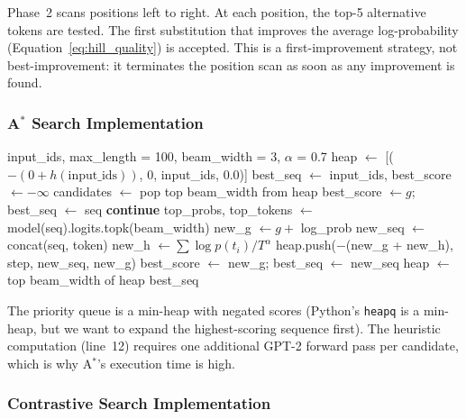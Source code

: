 \documentclass[12pt]{article}
\begin{document}
	Phase~2 scans positions left to right. At each position, the top-5 alternative tokens are tested. The first substitution that improves the average log-probability (Equation~\ref{eq:hill_quality}) is accepted. This is a first-improvement strategy, not best-improvement: it terminates the position scan as soon as any improvement is found.
	
	\subsubsection{A$^*$ Search Implementation}
	
	\begin{algorithm}[H]
		\caption{Improved A$^*$ Search}
		\label{alg:astar}
		\begin{algorithmic}[1]
			\Require input\_ids, max\_length = 100, beam\_width = 3, $\alpha$ = 0.7
			\State heap $\leftarrow$ [($-(0 + h(\text{input\_ids}))$, 0, input\_ids, 0.0)]
			\State best\_seq $\leftarrow$ input\_ids, best\_score $\leftarrow -\infty$
			\State candidates $\leftarrow$ pop top beam\_width from heap
			 best\_score $\leftarrow g$; best\_seq $\leftarrow$ seq \EndIf
			\State \textbf{continue}
			\EndIf
			\State top\_probs, top\_tokens $\leftarrow$ model(seq).logits.topk(beam\_width)
			\State new\_g $\leftarrow g + $ log\_prob
			\State new\_seq $\leftarrow$ concat(seq, token)
			\State new\_h $\leftarrow \sum \log p(t_i) / T^{\alpha}$ 
			\State heap.push($-$(new\_g + new\_h), step, new\_seq, new\_g)
			\EndFor
			 best\_score $\leftarrow$ new\_g; best\_seq $\leftarrow$ new\_seq \EndIf
			\EndFor
			\State heap $\leftarrow$ top beam\_width of heap 
			\EndFor
			\Return best\_seq
		\end{algorithmic}
	\end{algorithm}
	
	The priority queue is a min-heap with negated scores (Python's \texttt{heapq} is a min-heap, but we want to expand the highest-scoring sequence first). The heuristic computation (line~12) requires one additional GPT-2 forward pass per candidate, which is why A$^*$'s execution time is high.
	
	\subsubsection{Contrastive Search Implementation}
	
\end{document}
